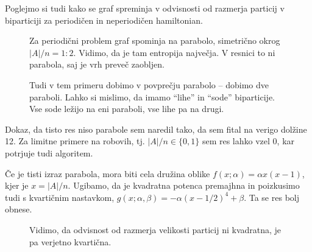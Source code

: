 \documentclass[12pt, a4paper]{article}
\begin{document}
Poglejmo si tudi kako se graf spreminja v odvisnosti od razmerja particij v biparticiji za periodi\v cen in
neperiodi\v cen hamiltonian.

\begin{figure}[H]\centering
	
	\caption{Za periodi\v cni problem graf spominja na parabolo, simetri\v cno okrog $|A|/n = 1:2$. Vidimo, da je
		tam entropija najve\v cja. V resnici to ni parabola, saj je vrh preve\v c zaobljen.}
	\label{1-periodicni-aji}
\end{figure}

\begin{figure}[H]\centering
	
	\caption{Tudi v tem primeru dobimo v povpre\v cju parabolo -- dobimo dve paraboli. Lahko si mislimo, da imamo
		"`lihe"' in "`sode"' biparticije. Vse sode le\v zijo na eni paraboli, vse lihe pa na drugi.}
	\label{1-neperiodicni-aji}
\end{figure}

Dokaz, da tisto res niso parabole sem naredil tako, da sem fital na verigo dol\v zine 12. Za limitne primere na robovih,
tj. $|A|/n \in \{0,1\}$ sem res lahko vzel $0$, kar potrjuje tudi algoritem.

\v Ce je tisti izraz parabola, mora biti cela dru\v zina oblike $f(x;\alpha) = \alpha x(x-1)$, kjer je $x = |A|/n$. Ugibamo,
da je kvadratna potenca premajhna in poizkusimo tudi s kvarti\v cnim nastavkom, $g(x;\alpha,\beta) = -\alpha(x-1/2)^4 + \beta$.
Ta se res bolj obnese.

\begin{figure}[H]\centering
	
	\caption{Vidimo, da odvisnost od razmerja velikosti particij ni kvadratna, je pa verjetno kvarti\v cna.}
	\label{1-ni-parabola-a}
\end{figure}
\end{document}
